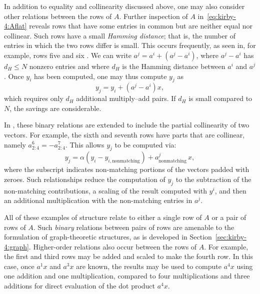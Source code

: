 In addition to equality and collinearity discussed above, one may also
consider other relations between the rows of $A$. Further inspection
of $A$ in~\eqref{eq:kirby-4:Aflat} reveals rows that have some entries
in common but are neither equal nor collinear. Such rows have a small
\emph{Hamming distance}; that is, the number of entries in which the two
rows differ is small. This occurs frequently, as seen in, for example,
rows five and six . We can write $ a^j = a^i + (a^j-a^i) $, where $ a^j
-a^i $ has $ d_H \leqslant N $ nonzero entries and where $d_H$ is the
Hamming distance between $a^i$ and $a^j$. Once $ y_i $ has been computed,
one may thus compute $y_j$ as
\begin{equation}
y_j = y_i + \left( a^j - a^i \right) x,
\end{equation}
which requires only $ d_H $ additional multiply--add pairs. If
$ d_H $ is small compared to $ N $, the savings are considerable.

In \citet{WolfHeath2009}, these binary relations are extended to
include the partial collinearity of two vectors. For example, the
sixth and seventh rows have parts that are collinear, namely
$a^6_{2:4} = - a^7_{2:4}$. This allows $y_j$ to be computed via:
\begin{equation}
  y_j = \alpha(y_i - y_{i,\mathrm{nonmatching}}) + a^j_{\mathrm{nonmatching}} \, x,
\end{equation}
where the subscript indicates non-matching portions of the vectors
padded with zeroes. Such relationships reduce the computation of $y_j$
to the subtraction of the non-matching contributions, a scaling of the
result computed with $y^i$, and then an additional multiplication with
the non-matching entries in $a^j$.

All of these examples of structure relate to either a single row of $
A $ or a pair of rows of $ A $. Such \emph{binary} relations
between pairs of rows are amenable to the formulation of
graph-theoretic structures, as is developed in
Section~\ref{sec:kirby-4:graph}. Higher-order relations also occur
between the rows of $ A $. For example, the first and third rows may
be added and scaled to make the fourth row. In this case, once $ a^1
x $ and $ a^3 x $ are known, the results may be used to compute $
a^{4} x $ using one addition and one multiplication, compared to four
multiplications and three additions for direct evaluation of the dot
product $a^{4} x$.

